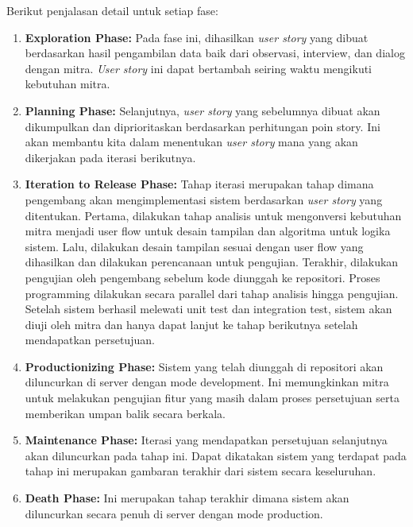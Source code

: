 Berikut penjalasan detail untuk setiap fase:
\begin{enumerate}
    \item \textbf{Exploration Phase:}
    Pada fase ini, dihasilkan \textit{user story} yang dibuat berdasarkan hasil pengambilan data baik dari observasi, interview, dan dialog dengan mitra. \textit{User story} ini dapat bertambah seiring waktu mengikuti kebutuhan mitra.

    \item \textbf{Planning Phase:}
    Selanjutnya, \textit{user story} yang sebelumnya dibuat akan dikumpulkan dan diprioritaskan berdasarkan perhitungan poin story. Ini akan membantu kita dalam menentukan \textit{user story} mana yang akan dikerjakan pada iterasi berikutnya.

    \item \textbf{Iteration to Release Phase:}
    Tahap iterasi merupakan tahap dimana pengembang akan mengimplementasi sistem berdasarkan \textit{user story} yang ditentukan. Pertama, dilakukan tahap analisis untuk mengonversi kebutuhan mitra menjadi user flow untuk desain tampilan dan algoritma untuk logika sistem. Lalu, dilakukan desain tampilan sesuai dengan user flow yang dihasilkan dan dilakukan perencanaan untuk pengujian. Terakhir, dilakukan pengujian oleh pengembang sebelum kode diunggah ke repositori. Proses programming dilakukan secara parallel dari tahap analisis hingga pengujian. Setelah sistem berhasil melewati unit test dan integration test, sistem akan diuji oleh mitra dan hanya dapat lanjut ke tahap berikutnya setelah mendapatkan persetujuan.

    \item \textbf{Productionizing Phase:}
    Sistem yang telah diunggah di repositori akan diluncurkan di server dengan mode development. Ini memungkinkan mitra untuk melakukan pengujian fitur yang masih dalam proses persetujuan serta memberikan umpan balik secara berkala.

    \item \textbf{Maintenance Phase:}
    Iterasi yang mendapatkan persetujuan selanjutnya akan diluncurkan pada tahap ini. Dapat dikatakan sistem yang terdapat pada tahap ini merupakan gambaran terakhir dari sistem secara keseluruhan.

    \item \textbf{Death Phase:}
    Ini merupakan tahap terakhir dimana sistem akan diluncurkan secara penuh di server dengan mode production.
\end{enumerate}

